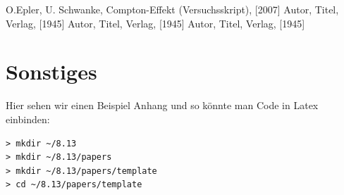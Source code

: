 \documentclass[aps,twocolumn,secnumarabic,nobalancelastpage,amsmath,amssymb,
nofootinbib,superscriptaddress]{revtex4-1}
\begin{document}


\begin{thebibliography}{99}
O.Epler, U. Schwanke, Compton-Effekt (Versuchsskript),  [2007]
Autor, Titel, Verlag,  [1945]
Autor, Titel, Verlag,  [1945]
Autor, Titel, Verlag,  [1945]
\end{thebibliography}


\clearpage
\appendix

\section{Sonstiges}
Hier sehen wir einen Beispiel Anhang und so könnte man Code in Latex einbinden:
\begin{verbatim}
> mkdir ~/8.13
> mkdir ~/8.13/papers
> mkdir ~/8.13/papers/template
> cd ~/8.13/papers/template
\end{verbatim}


\end{document}
